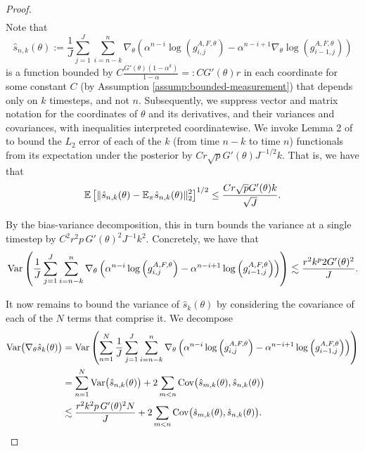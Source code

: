 \begin{proof}
\begin{align}
\end{align}
Note that 
\begin{equation}
\hat s_{n,k}(\theta) := \frac{1}{J}\sum_{j=1}^J\sum_{i=n-k}^n \nabla_\theta\left(\alpha^{n-i} \log\left(g_{i,j}^{A,F,\theta}\right)- \alpha^{n-i+1} \nabla_\theta \log\left(g_{i-1,j}^{A,F,\theta}\right)\right)
\end{equation} 
is a function bounded by $C\frac{G'(\theta)(1-\alpha^k)}{1-\alpha} =: CG'(\theta)r$ in each coordinate for some constant $C$ (by Assumption \ref{assump:bounded-measurement}) that depends only on $k$ timesteps, and not $n$. 
Subsequently, we suppress vector and matrix notation for the coordinates of $\theta$ and its derivatives, and their variances and covariances, with inequalities interpreted coordinatewise.
We invoke Lemma 2 of \cite{karjalainen23} to bound the $L_2$ error of each of the $k$ (from time $n-k$ to time $n$) functionals from its expectation under the posterior by $Cr\sqrt{p}G'(\theta)J^{-1/2}k$. 
That is, we have that
\begin{equation}\mathbb{E}\left[\|\hat s_{n,k}(\theta) - \mathbb{E}_{\pi}\hat s_{n,k}(\theta)\|_2^2\right]^{1/2} \leq \frac{Cr\sqrt{p}G'(\theta) k}{\sqrt{J}}.\end{equation}


By the bias-variance decomposition, this in turn bounds the variance at a single timestep by $C^2r^2p \, G'(\theta)^2J^{-1}k^2$. Concretely, we have that
\begin{equation}\mathrm{Var}\left(\frac{1}{J}\sum_{j=1}^J\sum_{i=n-k}^n \nabla_\theta\left(\alpha^{n-i} \log\left(g_{i,j}^{A,F,\theta}\right)- \alpha^{n-i+1} \log\left(g_{i-1,j}^{A,F,\theta}\right)\right)\right) \lesssim \frac{r^2k^p2G'(\theta)^2}{J}.\end{equation}

It now remains to bound the variance of $\hat s_k(\theta)$ by considering the covariance of each of the $N$ terms that comprise it. 
We decompose
\begin{align}
    \mathrm{Var}\big(\nabla_\theta \hat s_k(\theta)\big) &= \mathrm{Var}\left(\sum_{n=1}^N \frac{1}{J}\sum_{j=1}^J\sum_{i=n-k}^n \nabla_\theta\left(\alpha^{n-i} \log\left(g_{i,j}^{A,F,\theta}\right)- \alpha^{n-i+1} \log\left(g_{i-1,j}^{A,F,\theta}\right)\right)\right) \\
    &= \sum_{n=1}^N\mathrm{Var}\big(\hat s_{n,k}(\theta)\big)+ 2\sum_{m<n}\mathrm{Cov}\big(\hat s_{m,k}(\theta), \hat s_{n,k}(\theta)\big) \\
    &\lesssim \frac{r^2k^2p \, G'(\theta)^2N}{J} + 2\sum_{m<n}\mathrm{Cov}\big(\hat s_{m,k}(\theta), \hat s_{n,k}(\theta)\big).
\end{align}


\end{proof}
